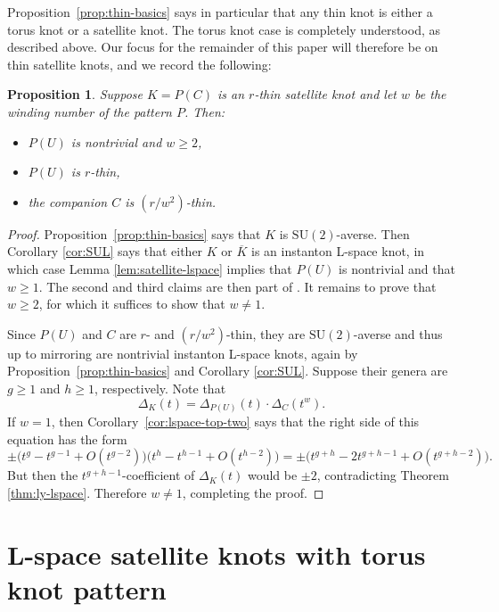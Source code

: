 \documentclass[11pt]{amsart}
\newtheorem {proposition}[theorem]{Proposition}
\numberwithin{equation}{section}
\numberwithin{theorem}{section}
\theoremstyle{definition}
\newcommand\SU{\mathrm{SU}}
\newcommand{\mirror}[1]{\overline{#1}}
\begin{document}
Proposition~\ref{prop:thin-basics} says in particular that  any thin knot  is either a torus knot or a satellite knot. The torus knot case is completely understood, as described above. Our focus for the remainder of this paper will therefore be on thin satellite knots, and we record the following:

\begin{proposition} \label{prop:thin-satellite}
Suppose  $K = P(C)$ is an $r$-thin satellite knot and let $w$ be the winding number of the pattern $P$.  Then:
\begin{itemize}
\item $P(U)$ is nontrivial and $w \geq 2$,
\item $P(U)$ is $r$-thin,
\item the companion $C$ is $(r/w^2)$-thin.
\end{itemize}
\end{proposition}

\begin{proof}
Proposition~\ref{prop:thin-basics} says that $K$ is $\SU(2)$-averse. Then Corollary \ref{cor:SUL} says that either $K$ or $\mirror{K}$ is an instanton L-space knot, in which case  Lemma \ref{lem:satellite-lspace} implies that $P(U)$ is nontrivial and that $w \geq 1$. The second and third claims are then part of \cite[Lemma~10.12]{bs-lspace}.
It remains to prove that $w \geq 2$, for which it  suffices to show that $w\neq 1$.  

Since $P(U)$ and $C$ are $r$- and $(r/w^2)$-thin, they are $\SU(2)$-averse and thus up to mirroring are nontrivial instanton L-space knots, again by Proposition~\ref{prop:thin-basics} and Corollary \ref{cor:SUL}. Suppose their genera are $g \geq 1$ and $h\geq 1$, respectively.  Note that \[ \Delta_K(t) = \Delta_{P(U)}(t) \cdot \Delta_C(t^w). \] If $w=1$, then Corollary~\ref{cor:lspace-top-two} says that the right side of this equation
has the form
\[ \pm\big(t^g - t^{g-1} + O(t^{g-2})\big)\big(t^h - t^{h-1} + O(t^{h-2})\big) = \pm\big( t^{g+h} - 2t^{g+h-1} + O(t^{g+h-2}) \big). \]
But then the $t^{g+h-1}$-coefficient of $\Delta_K(t)$ would be $\pm2$, contradicting Theorem \ref{thm:ly-lspace}.  Therefore $w \neq 1$, completing the proof.
\end{proof}

%
%
%
%
%

\section{L-space satellite knots with torus knot pattern} \label{sec:satellites}
\end{document}
